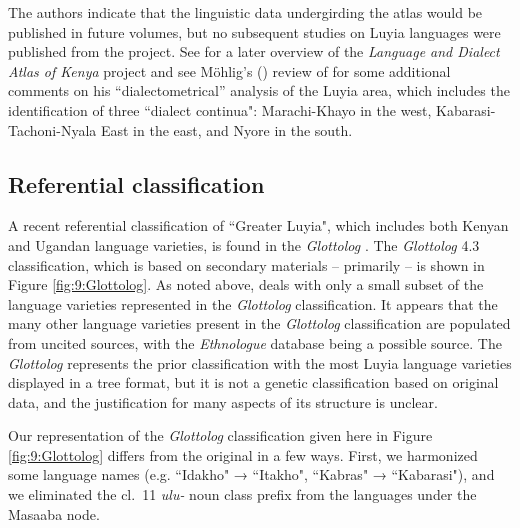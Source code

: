 \documentclass[output=paper]{langscibook}
\begin{document}
The authors indicate that the linguistic data undergirding the atlas would be published in future volumes, but no subsequent studies on Luyia languages were published from the project. See \citet{heine_language_2013} for a later overview of the \textit{Language and Dialect Atlas of Kenya} project and see Möhlig's  (\citeyear{mohlig-1985-review-of-angogo-kanyoro-1983}) review of \citet{angogokanyoro1983} for some additional comments on his “dialectometrical” analysis of the Luyia area, which includes the identification of three ``dialect continua": Marachi-Khayo in the west, Kabarasi-Tachoni-Nyala East in the east, and Nyore in the south. 


\subsection{Referential classification \citep{glottolog}}
\label{sec:2.4:Referential_classification}

A recent referential classification of ``Greater Luyia", which includes both Kenyan and Ugandan language varieties, is found in the \textit{Glottolog} \citep{glottolog}. The \textit{Glottolog} 4.3 classification, which is based on secondary materials -- primarily \citet{mould_greater_1981} -- is shown in Figure \ref{fig:9:Glottolog}. As noted above, \citet{mould_greater_1981} deals with only a small subset of the language varieties represented in the \textit{Glottolog} classification. It appears that the many other language varieties present in the \textit{Glottolog} classification are populated from uncited sources, with the \textit{Ethnologue} database being a possible source. The \textit{Glottolog} represents the prior classification with the most Luyia language varieties displayed in a tree format, but it is not a genetic classification based on original data, and the justification for many aspects of its structure is unclear. 

Our representation of the \textit{Glottolog} classification given here in Figure \ref{fig:9:Glottolog} differs from the original in a few ways. First, we harmonized some language names (e.g. ``Idakho" → ``Itakho", ``Kabras" → ``Kabarasi"), and we eliminated the cl.\ 11 \textit{ulu-} noun class prefix from the languages under the Masaaba node. 
\end{document}
